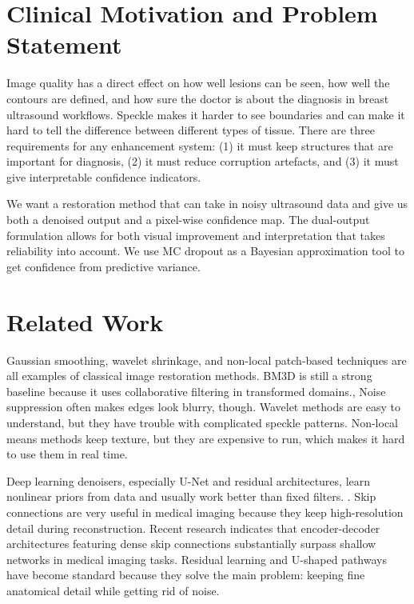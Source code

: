 \documentclass[conference]{IEEEtran}
\begin{document}
\section{Clinical Motivation and Problem Statement}
Image quality has a direct effect on how well lesions can be seen, how well the contours are defined, and how sure the doctor is about the diagnosis in breast ultrasound workflows. Speckle makes it harder to see boundaries and can make it hard to tell the difference between different types of tissue. There are three requirements for any enhancement system: (1) it must keep structures that are important for diagnosis, (2) it must reduce corruption artefacts, and (3) it must give interpretable confidence indicators.

We want a restoration method that can take in noisy ultrasound data and give us both a denoised output and a pixel-wise confidence map. The dual-output formulation allows for both visual improvement and interpretation that takes reliability into account. We use MC dropout as a Bayesian approximation tool to get confidence from predictive variance.

\section{Related Work}
Gaussian smoothing, wavelet shrinkage, and non-local patch-based techniques are all examples of classical image restoration methods. BM3D is still a strong baseline because it uses collaborative filtering in transformed domains.\cite{dabov2007bm3d}, Noise suppression often makes edges look blurry, though. Wavelet methods are easy to understand, but they have trouble with complicated speckle patterns. Non-local means methods keep texture, but they are expensive to run, which makes it hard to use them in real time.

Deep learning denoisers, especially U-Net and residual architectures, learn nonlinear priors from data and usually work better than fixed filters. \cite{zhang2017dncnn, ronneberger2015unet}. Skip connections are very useful in medical imaging because they keep high-resolution detail during reconstruction. Recent research indicates that encoder-decoder architectures featuring dense skip connections substantially surpass shallow networks in medical imaging tasks. Residual learning and U-shaped pathways have become standard because they solve the main problem: keeping fine anatomical detail while getting rid of noise.
\end{document}
